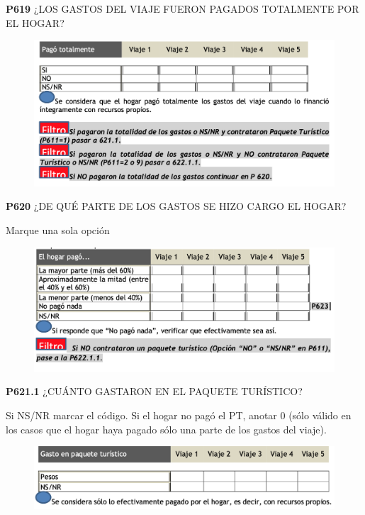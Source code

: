 \documentclass[
  openany]{book}
\begin{document}
\textbf{P619} ¿LOS GASTOS DEL VIAJE FUERON PAGADOS TOTALMENTE POR EL HOGAR?

\begin{figure}

{\centering \includegraphics[width=1\linewidth]{imagenes/figura6-229} 

}

\end{figure}

\textbf{P620} ¿DE QUÉ PARTE DE LOS GASTOS SE HIZO CARGO EL HOGAR?

Marque una sola opción

\begin{figure}

{\centering \includegraphics[width=1\linewidth]{imagenes/figura6-230} 

}

\end{figure}

\textbf{P621.1} ¿CUÁNTO GASTARON EN EL PAQUETE TURÍSTICO?

Si NS/NR marcar el código. Si el hogar no pagó el PT, anotar 0 (sólo válido en los casos que el hogar haya pagado sólo una parte de los gastos del viaje).

\begin{figure}

{\centering \includegraphics[width=1\linewidth]{imagenes/figura6-231} 

}

\end{figure}
\end{document}
